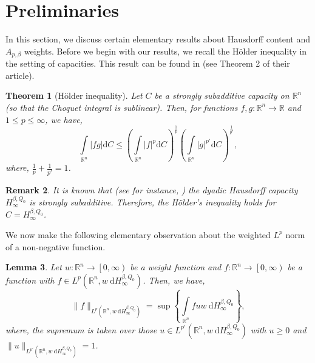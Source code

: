 \documentclass{amsart}
\newtheorem{theorem}{Theorem}
\newtheorem{lemma}[theorem]{Lemma}
\newtheorem{remark}[theorem]{Remark}
\numberwithin{theorem}{section}
\numberwithin{equation}{section}
\begin{document}
	\section{Preliminaries}
		\label{PreliminariesSection}
		In this section, we discuss certain elementary results about Hausdorff content and $A_{p, \beta}$ weights. Before we begin with our results, we recall the H\"{o}lder inequality in the setting of capacities. This result can be found in \cite{Cerda} (see Theorem 2 of their article).
		\begin{theorem}[H\"{o}lder inequality]
			\label{HolderInequalityTheorem}
			Let $C$ be a strongly subadditive capacity on $\mathbb{R}^n$ (so that the Choquet integral is sublinear). Then, for functions $f, g: \mathbb{R}^n \rightarrow \mathbb{R}$ and $1 \leq p \leq \infty$, we have,
			\begin{equation}
				\label{HOlderInequality}
				\int\limits_{\mathbb{R}^n} \left| fg \right| \mathrm{d}C \leq \left( \int\limits_{\mathbb{R}^n} \left| f \right|^p \mathrm{d}C \right)^{\frac{1}{p}} \left( \int\limits_{\mathbb{R}^n} \left| g \right|^{p'} \mathrm{d}C \right)^{\frac{1}{p'}},
			\end{equation}
			where, $\frac{1}{p} + \frac{1}{p'} = 1$.
		\end{theorem}
		\begin{remark}
			\normalfont
			It is known that (see for instance, \cite{PonceSpector}) the dyadic Hausdorff capacity $H^{\beta, Q_0}_{\infty}$ is strongly subadditive. Therefore, the H\"{o}lder's inequality holds for $C = H^{\beta, Q_0}_{\infty}$.
		\end{remark}
		We now make the following elementary observation about the weighted $L^p$ norm of a non-negative function.
		\begin{lemma}
			\label{DualityLemma}
			Let $w: \mathbb{R}^n \rightarrow \left[ 0, \infty \right)$ be a weight function and $f: \mathbb{R}^n \rightarrow \left[ 0, \infty \right)$ be a function with $f \in L^p \left( \mathbb{R}^n, w \ \mathrm{d}H^{\beta, Q_0}_{\infty} \right)$. Then, we have,
			\begin{equation}
				\label{DualityNorm}
				\| f \|_{L^p \left( \mathbb{R}^n, w \ \mathrm{d}H^{\beta, Q_0}_{\infty} \right)} = \sup \left\lbrace \int\limits_{\mathbb{R}^n} fuw \ \mathrm{d}H^{\beta, Q_0}_{\infty} \right\rbrace,
			\end{equation}
			where, the supremum is taken over those $u \in L^{p'} \left( \mathbb{R}^n, w \ \mathrm{d}H^{\beta, Q_0}_{\infty} \right)$ with $u \geq 0$ and $\| u \|_{L^{p'} \left( \mathbb{R}^n, w \ \mathrm{d}H^{\beta, Q_0}_{\infty} \right)} = 1$.
		\end{lemma}
\end{document}
